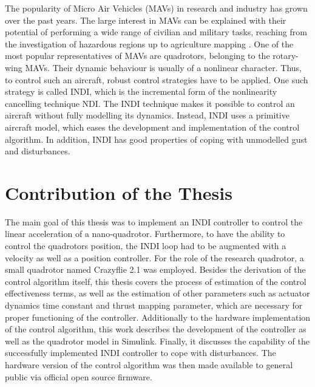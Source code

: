 \documentclass[11pt, a4paper, twoside]{report}
\begin{document}
The popularity of Micro Air Vehicles (MAVs) in research and industry has grown over the past years. The large interest in \acrshort{MAV}s can be explained with their potential of performing a wide range of civilian and military tasks, reaching from the investigation of hazardous regions up to agriculture mapping \cite{Ward}. One of the most popular representatives of \acrshort{MAV}s are quadrotors, belonging to the rotary-wing \acrshort{MAV}s. Their dynamic behaviour is usually of a nonlinear character. Thus, to control such an aircraft, robust control strategies have to be applied. One such strategy is called \acrfull{INDI}, which is the incremental form of the nonlinearity cancelling technique \acrfull{NDI}. The \acrshort{INDI} technique makes it possible to control an aircraft without fully modelling its dynamics. Instead, \acrshort{INDI} uses a primitive aircraft model, which eases the development and implementation of the control algorithm. In addition, \acrshort{INDI} has good properties of coping with unmodelled gust and disturbances. 

\section{Contribution of the Thesis} \label{sec:contribution_ofthe_thesis}

The main goal of this thesis was to implement an \acrshort{INDI} controller to control the linear acceleration of a nano-quadrotor. Furthermore, to have the ability to control the quadrotors position, the \acrshort{INDI} loop had to be augmented with a velocity as well as a position controller. For the role of the research quadrotor, a small quadrotor named Crazyflie 2.1 was employed. Besides the derivation of the control algorithm itself, this thesis covers the process of estimation of the control effectiveness terms, as well as the estimation of other parameters such as actuator dynamics time constant and thrust mapping parameter, which are necessary for proper functioning of the controller. Additionally to the hardware implementation of the control algorithm, this work describes the development of the controller as well as the quadrotor model in Simulink. Finally, it discusses the capability of the successfully implemented \acrshort{INDI} controller to cope with disturbances. The hardware version of the control algorithm was then made available to general public via official open source firmware.

\end{document}
